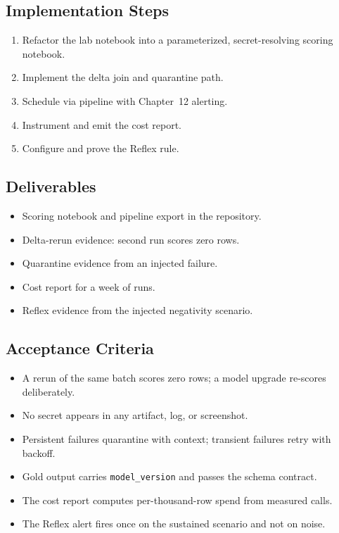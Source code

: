\subsection*{Implementation Steps}
\begin{enumerate}
    \item Refactor the lab notebook into a parameterized, secret-resolving scoring notebook.
    \item Implement the delta join and quarantine path.
    \item Schedule via pipeline with Chapter~12 alerting.
    \item Instrument and emit the cost report.
    \item Configure and prove the Reflex rule.
\end{enumerate}

\subsection*{Deliverables}
\begin{itemize}
    \item Scoring notebook and pipeline export in the repository.
    \item Delta-rerun evidence: second run scores zero rows.
    \item Quarantine evidence from an injected failure.
    \item Cost report for a week of runs.
    \item Reflex evidence from the injected negativity scenario.
\end{itemize}

\subsection*{Acceptance Criteria}
\begin{itemize}
    \item[\(\square\)] A rerun of the same batch scores zero rows; a model upgrade re-scores deliberately.
    \item[\(\square\)] No secret appears in any artifact, log, or screenshot.
    \item[\(\square\)] Persistent failures quarantine with context; transient failures retry with backoff.
    \item[\(\square\)] Gold output carries \texttt{model\_version} and passes the schema contract.
    \item[\(\square\)] The cost report computes per-thousand-row spend from measured calls.
    \item[\(\square\)] The Reflex alert fires once on the sustained scenario and not on noise.
\end{itemize}

